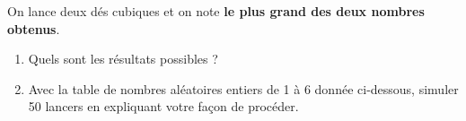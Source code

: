 \begin{exo}\label{fluctuex2}
On lance deux d\'es cubiques et on note \textbf{le plus grand des deux nombres obtenus}.
\begin{enumerate}
	\item Quels sont les r\'esultats possibles ?
	\item Avec la table de nombres al\'eatoires entiers de 1 \`a 6 donn\'ee ci-dessous, simuler 50 lancers en expliquant votre façon de proc\'eder.

\reinitrand[first=1, last=6] %
\begin{center}
\rand{} \quad \rand{} \quad \rand{} \quad \rand{} \quad \rand{} \quad \rand{} \quad \rand{} \quad \rand{} \quad \rand{} \quad \rand{} \quad \rand{} \quad \rand{} \quad \rand{} \quad \rand{} \quad \rand{} \quad \rand{} \quad \rand{} \quad \rand{} \quad \rand{} \quad \rand{}

\rand{} \quad \rand{} \quad \rand{} \quad \rand{} \quad \rand{} \quad \rand{} \quad \rand{} \quad \rand{} \quad \rand{} \quad \rand{} \quad \rand{} \quad \rand{} \quad \rand{} \quad \rand{} \quad \rand{} \quad \rand{} \quad \rand{} \quad \rand{} \quad \rand{} \quad \rand{}

\rand{} \quad \rand{} \quad \rand{} \quad \rand{} \quad \rand{} \quad \rand{} \quad \rand{} \quad \rand{} \quad \rand{} \quad \rand{} \quad \rand{} \quad \rand{} \quad \rand{} \quad \rand{} \quad \rand{} \quad \rand{} \quad \rand{} \quad \rand{} \quad \rand{} \quad \rand{}

\rand{} \quad \rand{} \quad \rand{} \quad \rand{} \quad \rand{} \quad \rand{} \quad \rand{} \quad \rand{} \quad \rand{} \quad \rand{} \quad \rand{} \quad \rand{} \quad \rand{} \quad \rand{} \quad \rand{} \quad \rand{} \quad \rand{} \quad \rand{} \quad \rand{} \quad \rand{}


\end{center}
\end{enumerate}
\end{exo}
